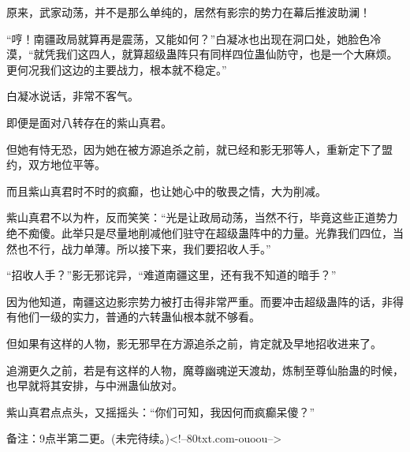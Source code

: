 \begin{this_body}
原来，武家动荡，并不是那么单纯的，居然有影宗的势力在幕后推波助澜！

“哼！南疆政局就算再是震荡，又能如何？”白凝冰也出现在洞口处，她脸色冷漠，“就凭我们这四人，就算超级蛊阵只有同样四位蛊仙防守，也是一个大麻烦。更何况我们这边的主要战力，根本就不稳定。”

白凝冰说话，非常不客气。

即便是面对八转存在的紫山真君。

但她有恃无恐，因为她在被方源追杀之前，就已经和影无邪等人，重新定下了盟约，双方地位平等。

而且紫山真君时不时的疯癫，也让她心中的敬畏之情，大为削减。

紫山真君不以为杵，反而笑笑：“光是让政局动荡，当然不行，毕竟这些正道势力绝不痴傻。此举只是尽量地削减他们驻守在超级蛊阵中的力量。光靠我们四位，当然也不行，战力单薄。所以接下来，我们要招收人手。”

“招收人手？”影无邪诧异，“难道南疆这里，还有我不知道的暗手？”

因为他知道，南疆这边影宗势力被打击得非常严重。而要冲击超级蛊阵的话，非得有他们一级的实力，普通的六转蛊仙根本就不够看。

但如果有这样的人物，影无邪早在方源追杀之前，肯定就及早地招收进来了。

追溯更久之前，若是有这样的人物，魔尊幽魂逆天渡劫，炼制至尊仙胎蛊的时候，也早就将其安排，与中洲蛊仙放对。

紫山真君点点头，又摇摇头：“你们可知，我因何而疯癫呆傻？”

备注：9点半第二更。(未完待续。)<!--80txt.com-ouoou-->

\end{this_body}


